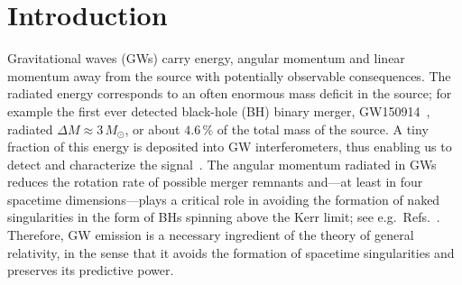 



\def\aj{\rm{AJ}}
\def\apj{\rm{ApJ}}
\def\apjl{\rm{ApJ}}
\def\apjs{\rm{ApJS}}
\def\aap{\rm{A\&A}}
\def\aaps{\rm{A\&AS}}
\def\mnras{\rm{MNRAS}}
\def\prd{\rm{PRD}}
\def\prl{\rm{PRL}}
\def\prx{\rm{PRX}}
\def\nat{\rm{Nature}}
\def\cqg{\rm{CQG}}
\def\grg{\rm{GRG}}
\def\lrr{\rm{LRR}}
\newcommand{\rad}{\mathrm{rad}}
\newcommand{\tl}{\tilde{\ell}}
\newcommand{\tm}{\tilde{m}}
\newcommand{\rmd}{\mathrm{d}}




\section{Introduction}

Gravitational waves (GWs) carry energy, angular momentum and linear
momentum away from the source with potentially observable
consequences. The radiated energy corresponds to an often enormous
mass deficit in the source; for example the first ever detected
black-hole (BH) binary merger, GW150914~\cite{Abbott:2016blz}, radiated
$\Delta M\approx 3\,M_{\odot}$, or about $4.6\,\%$ of the total mass
of the source. A tiny fraction of this energy is deposited into GW
interferometers, thus enabling us to detect and characterize the
signal~\cite{Saulson:2010zz}. The angular momentum radiated in GWs
reduces the rotation rate of possible merger remnants and---at least
in four spacetime dimensions---plays a critical role in avoiding the
formation of naked singularities in the form of BHs spinning above the
Kerr limit; see
e.g.~Refs.~\cite{Campanelli:2006uy,Sperhake:2009jz}. Therefore, GW emission
is a necessary ingredient of the theory of general relativity, in the
sense that it avoids the formation of spacetime singularities and
preserves its predictive power.

